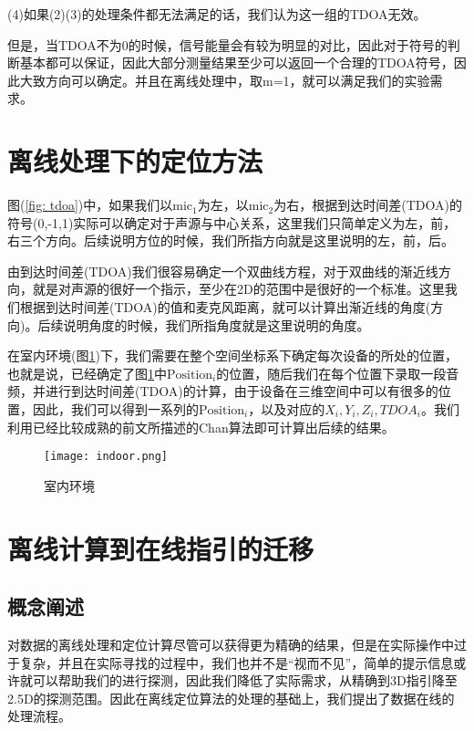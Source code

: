 \documentclass[winfonts]{njuthesis}
\begin{document}
		(4)如果(2)(3)的处理条件都无法满足的话，我们认为这一组的TDOA无效。
		
		但是，当TDOA不为0的时候，信号能量会有较为明显的对比，因此对于符号的判断基本都可以保证，因此大部分测量结果至少可以返回一个合理的TDOA符号，因此大致方向可以确定。并且在离线处理中，取m=1，就可以满足我们的实验需求。
		
	\section{离线处理下的定位方法}
		
		图(\ref{fig: tdoa})中，如果我们以$\text{mic}_1$为左，以$\text{mic}_2$为右，根据到达时间差(TDOA)的符号(0,-1,1)实际可以确定对于声源与中心关系，这里我们只简单定义为左，前，右三个方向。后续说明方位的时候，我们所指方向就是这里说明的左，前，后。
	
		由到达时间差(TDOA)我们很容易确定一个双曲线方程，对于双曲线的渐近线方向，就是对声源的很好一个指示，至少在2D的范围中是很好的一个标准。这里我们根据到达时间差(TDOA)的值和麦克风距离，就可以计算出渐近线的角度(方向)。后续说明角度的时候，我们所指角度就是这里说明的角度。
		
		在室内环境(图\ref{fig: indoor})下，我们需要在整个空间坐标系下确定每次设备的所处的位置，也就是说，已经确定了图\ref{fig: indoor}中$\text{Position}_i$的位置，随后我们在每个位置下录取一段音频，并进行到达时间差(TDOA)的计算，由于设备在三维空间中可以有很多的位置，因此，我们可以得到一系列的$\text{Position}_i$，以及对应的$X_i,Y_i,Z_i,TDOA_i$。我们利用已经比较成熟的前文所描述的Chan算法即可计算出后续的结果。
		
		\begin{figure}[H]
			\centering
			\texttt{[image: indoor.png]} 
			\caption{{室内环境}}
			\label{fig: indoor}
		\end{figure}
		
	
	\section{离线计算到在线指引的迁移}
	
		\subsection{概念阐述}
			
			对数据的离线处理和定位计算尽管可以获得更为精确的结果，但是在实际操作中过于复杂，并且在实际寻找的过程中，我们也并不是“视而不见”，简单的提示信息或许就可以帮助我们的进行探测，因此我们降低了实际需求，从精确到3D指引降至2.5D的探测范围。因此在离线定位算法的处理的基础上，我们提出了数据在线的处理流程。
		
\end{document}
